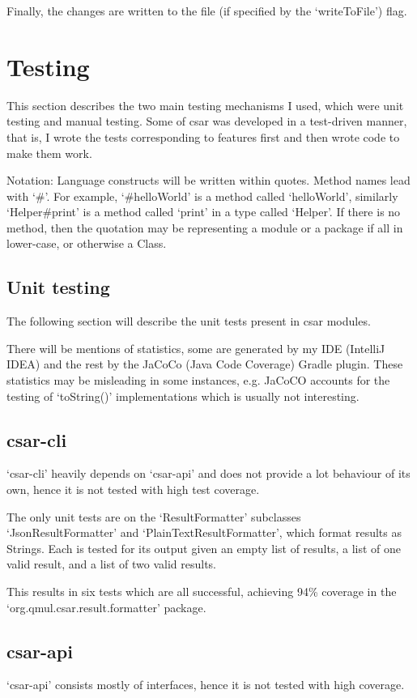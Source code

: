 \documentclass[12pt, letterpaper]{article}
\begin{document}
Finally, the changes are written to the file (if specified by the `writeToFile') flag.

\section{Testing}
This section describes the two main testing mechanisms I used, which were unit testing and manual testing.
Some of csar was developed in a test-driven manner, that is, I wrote the tests corresponding to features first and then wrote code to make them work.

Notation: Language constructs will be written within quotes.
Method names lead with `\#'.
For example, `\#helloWorld' is a method called `helloWorld', similarly `Helper\#print' is a method called `print' in a type called `Helper'.
If there is no method, then the quotation may be representing a module or a package if all in lower-case, or otherwise a Class.

\subsection{Unit testing}
The following section will describe the unit tests present in csar modules.

There will be mentions of statistics, some are generated by my IDE (IntelliJ IDEA) and the rest by the JaCoCo (Java Code Coverage) Gradle plugin.
These statistics may be misleading in some instances, e.g. JaCoCO accounts for the testing of `toString()' implementations which is usually not interesting.

\subsection{csar-cli}
`csar-cli' heavily depends on `csar-api' and does not provide a lot behaviour of its own, hence it is not tested with high test coverage.

The only unit tests are on the `ResultFormatter' subclasses `JsonResultFormatter' and `PlainTextResultFormatter', which format results as Strings.
Each is tested for its output given an empty list of results, a list of one valid result, and a list of two valid results.

This results in six tests which are all successful, achieving 94\% coverage in the `org.qmul.csar.result.formatter' package.

\subsection{csar-api}
`csar-api' consists mostly of interfaces, hence it is not tested with high coverage.
\end{document}
